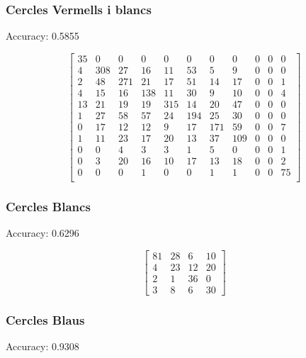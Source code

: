 \subsubsection{Cercles Vermells i blancs}

Accuracy: 0.5855

\begin{equation*}
\begin{bmatrix}
    35	&	0	&	0	&	0	&	0	&	0	&	0	&	0	&	0	&	0	&	0 \\
4	&	308	&	27	&	16	&	11	&	53	&	5	&	9	&	0	&	0	&	0 \\
2	&	48	&	271	&	21	&	17	&	51	&	14	&	17	&	0	&	0	&	1 \\
4	&	15	&	16	&	138	&	11	&	30	&	9	&	10	&	0	&	0	&	4 \\
13	&	21	&	19	&	19	&	315	&	14	&	20	&	47	&	0	&	0	&	0 \\
1	&	27	&	58	&	57	&	24	&	194	&	25	&	30	&	0	&	0	&	0 \\
0	&	17	&	12	&	12	&	9	&	17	&	171	&	59	&	0	&	0	&	7 \\
1	&	11	&	23	&	17	&	20	&	13	&	37	&	109	&	0	&	0	&	0 \\
0	&	0	&	4	&	3	&	3	&	1	&	5	&	0	&	0	&	0	&	1 \\
0	&	3	&	20	&	16	&	10	&	17	&	13	&	18	&	0	&	0	&	2 \\
0	&	0	&	0	&	1	&	0	&	0	&	1	&	1	&	0	&	0	&	75 \\
\end{bmatrix}
\end{equation*}

\subsubsection{Cercles Blancs}

Accuracy: 0.6296

\begin{equation*}
\begin{bmatrix}
81	& 28	& 6	& 10 \\
4	& 23	& 12	& 20 \\
2	& 1	& 36	& 0 \\
3	& 8	& 6	& 30
\end{bmatrix}
\end{equation*}

\subsubsection{Cercles Blaus}

Accuracy: 0.9308

